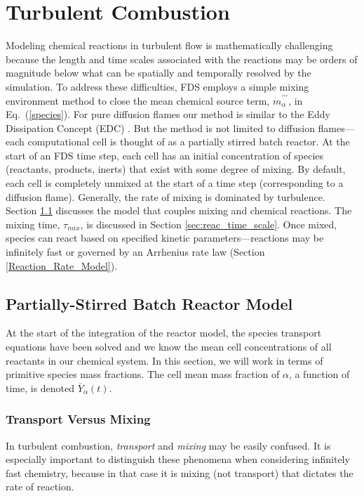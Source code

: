 \newpage
\section{Turbulent Combustion}

Modeling chemical reactions in turbulent flow is mathematically challenging because the length and time scales associated with the reactions may be orders of magnitude below what can be spatially and temporally resolved by the simulation. To address these difficulties, FDS employs a simple mixing environment method to close the mean chemical source term, $\dot{m}^{\prime\prime\prime}_{\alpha}$, in Eq.~(\ref{species}).  For pure diffusion flames our method is similar to the Eddy Dissipation Concept (EDC) \cite{Magnussen:1,Poinsot:TNC}. But the method is not limited to diffusion flames---each computational cell is thought of as a partially stirred batch reactor. At the start of an FDS time step, each cell has an initial concentration of species (reactants, products, inerts) that exist with some degree of mixing. By default, each cell is completely unmixed at the start of a time step (corresponding to a diffusion flame). Generally, the rate of mixing is dominated by turbulence. Section \ref{sec:EDC} discusses the model that couples mixing and chemical reactions. The mixing time, $\tau_{mix}$, is discussed in Section \ref{sec:reac_time_scale}. Once mixed, species can react based on specified kinetic parameters---reactions may be infinitely fast or governed by an Arrhenius rate law (Section \ref{Reaction_Rate_Model}).


\subsection{Partially-Stirred Batch Reactor Model}
\label{sec:EDC}

At the start of the integration of the reactor model, the species transport equations have been solved and we know the mean cell concentrations of all reactants in our chemical system.  In this section, we will work in terms of primitive species mass fractions.  The cell mean mass fraction of $\alpha$, a function of time, is denoted $\overline{Y}_\alpha(t)$.

\subsubsection{Transport Versus Mixing}

In turbulent combustion, \emph{transport} and \emph{mixing} may be easily confused.  It is especially important to distinguish these phenomena when considering infinitely fast chemistry, because in that case it is mixing (not transport) that dictates the rate of reaction.

